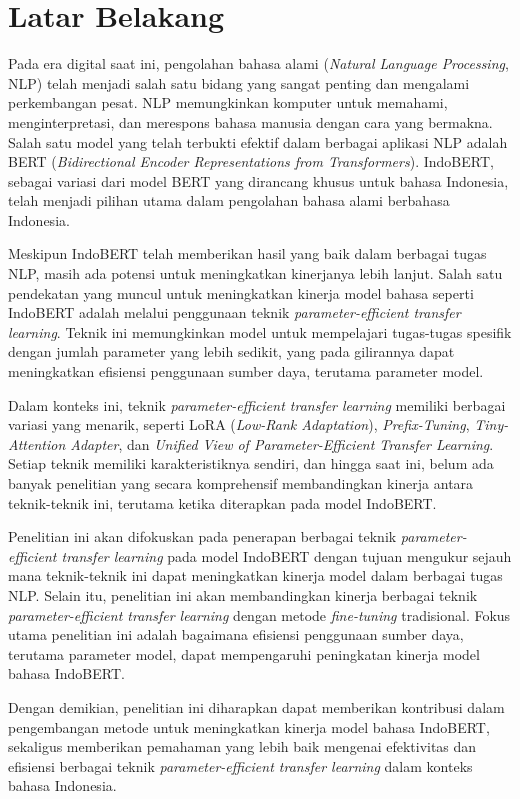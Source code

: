 \section{Latar Belakang}

Pada era digital saat ini, pengolahan bahasa alami (\textit{Natural Language Processing}, NLP) telah menjadi salah satu bidang yang sangat penting dan mengalami perkembangan pesat. NLP memungkinkan komputer untuk memahami, menginterpretasi, dan merespons bahasa manusia dengan cara yang bermakna. Salah satu model yang telah terbukti efektif dalam berbagai aplikasi NLP adalah BERT (\textit{Bidirectional Encoder Representations from Transformers}). IndoBERT, sebagai variasi dari model BERT yang dirancang khusus untuk bahasa Indonesia, telah menjadi pilihan utama dalam pengolahan bahasa alami berbahasa Indonesia.

Meskipun IndoBERT telah memberikan hasil yang baik dalam berbagai tugas NLP, masih ada potensi untuk meningkatkan kinerjanya lebih lanjut. Salah satu pendekatan yang muncul untuk meningkatkan kinerja model bahasa seperti IndoBERT adalah melalui penggunaan teknik \textit{parameter-efficient transfer learning}. Teknik ini memungkinkan model untuk mempelajari tugas-tugas spesifik dengan jumlah parameter yang lebih sedikit, yang pada gilirannya dapat meningkatkan efisiensi penggunaan sumber daya, terutama parameter model.

Dalam konteks ini, teknik \textit{parameter-efficient transfer learning} memiliki berbagai variasi yang menarik, seperti LoRA (\textit{Low-Rank Adaptation}), \textit{Prefix-Tuning}, \textit{Tiny-Attention Adapter}, dan \textit{Unified View of Parameter-Efficient Transfer Learning}. Setiap teknik memiliki karakteristiknya sendiri, dan hingga saat ini, belum ada banyak penelitian yang secara komprehensif membandingkan kinerja antara teknik-teknik ini, terutama ketika diterapkan pada model IndoBERT.

Penelitian ini akan difokuskan pada penerapan berbagai teknik \textit{parameter-efficient transfer learning} pada model IndoBERT dengan tujuan mengukur sejauh mana teknik-teknik ini dapat meningkatkan kinerja model dalam berbagai tugas NLP. Selain itu, penelitian ini akan membandingkan kinerja berbagai teknik \textit{parameter-efficient transfer learning} dengan metode \textit{fine-tuning} tradisional. Fokus utama penelitian ini adalah bagaimana efisiensi penggunaan sumber daya, terutama parameter model, dapat mempengaruhi peningkatan kinerja model bahasa IndoBERT.

Dengan demikian, penelitian ini diharapkan dapat memberikan kontribusi dalam pengembangan metode untuk meningkatkan kinerja model bahasa IndoBERT, sekaligus memberikan pemahaman yang lebih baik mengenai efektivitas dan efisiensi berbagai teknik \textit{parameter-efficient transfer learning} dalam konteks bahasa Indonesia.